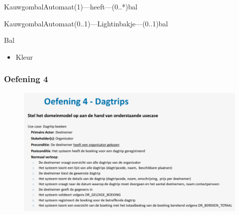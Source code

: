 \documentclass{article}
\begin{document}
KauwgombalAutomaat(1)---heeft---(0..*)bal


KauwgombalAutomaat(0..1)---Lightinbakje---(0..1)bal

Bal
\begin{itemize}
	\item Kleur
\end{itemize}

\subsubsection{Oefening 4}
\begin{figure}[h]
  \includegraphics[width=0.6\linewidth]{oef4.png}
\end{figure}
\end{document}
